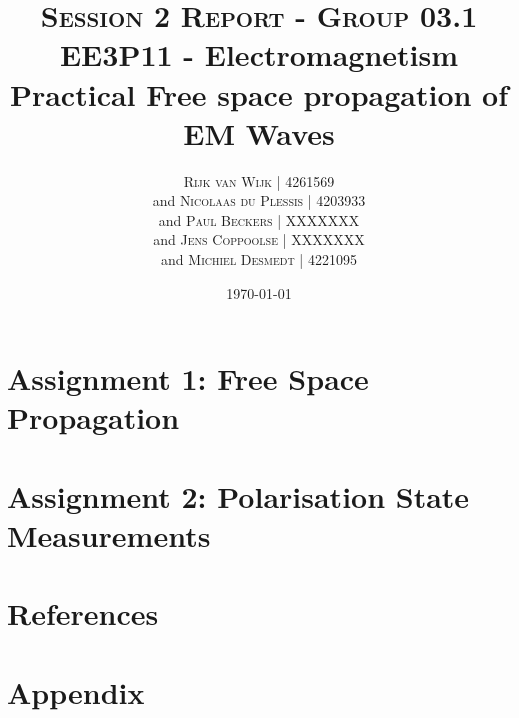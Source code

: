 \documentclass[11pt, a4paper, oneside]{article}
\title{\textsc{Session 2 Report - Group 03.1}
	\newline \textbf{EE3P11 - Electromagnetism Practical}
	\newline Free space propagation of EM Waves\\
}
\author{
	\textsc{Rijk van Wijk | 4261569}\\
	and
	\textsc{Nicolaas du Plessis | 4203933}\\
	and
	\textsc{Paul Beckers | XXXXXXX}\\
	and
	\textsc{Jens Coppoolse | XXXXXXX}\\
	and
	\textsc{Michiel Desmedt | 4221095}\\
}
\date {\today}
\let\stdsection\section
\renewcommand\section{\newpage\stdsection}
\begin{document}
	\maketitle
	\thispagestyle{empty}
	\newpage
	
	\section*{Assignment 1: Free Space Propagation}
	
	\section*{Assignment 2: Polarisation State Measurements}
	
	\section*{References}
	

	\section*{Appendix}
	
\end{document}
